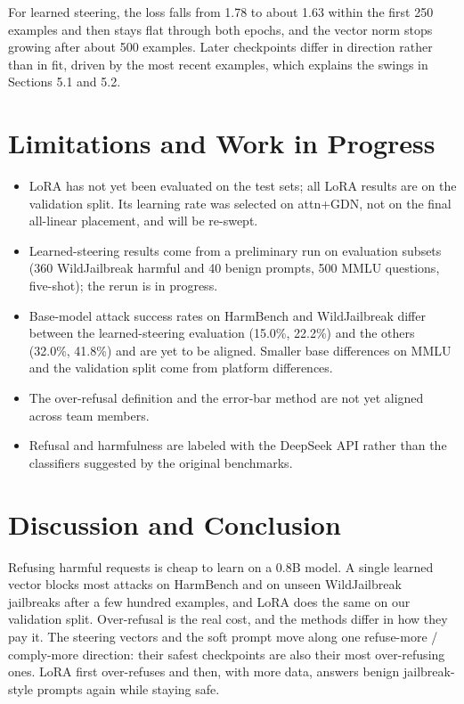 \documentclass{article}
\begin{document}
For learned steering, the loss falls from 1.78 to about 1.63 within the first 250 examples and then stays flat through both epochs, and the vector norm stops growing after about 500 examples. Later checkpoints differ in direction rather than in fit, driven by the most recent examples, which explains the swings in Sections 5.1 and 5.2.

\section{Limitations and Work in Progress}\label{sec:6}

\begin{itemize}
\item LoRA has not yet been evaluated on the test sets; all LoRA results are on the validation split. Its learning rate was selected on attn+GDN, not on the final all-linear placement, and will be re-swept.
\item Learned-steering results come from a preliminary run on evaluation subsets (360 WildJailbreak harmful and 40 benign prompts, 500 MMLU questions, five-shot); the rerun is in progress.
\item Base-model attack success rates on HarmBench and WildJailbreak differ between the learned-steering evaluation (15.0\%, 22.2\%) and the others (32.0\%, 41.8\%) and are yet to be aligned. Smaller base differences on MMLU and the validation split come from platform differences.
\item The over-refusal definition and the error-bar method are not yet aligned across team members.
\item Refusal and harmfulness are labeled with the DeepSeek API rather than the classifiers suggested by the original benchmarks.
\end{itemize}

\section{Discussion and Conclusion}\label{sec:7}

Refusing harmful requests is cheap to learn on a 0.8B model. A single learned vector blocks most attacks on HarmBench and on unseen WildJailbreak jailbreaks after a few hundred examples, and LoRA does the same on our validation split. Over-refusal is the real cost, and the methods differ in how they pay it. The steering vectors and the soft prompt move along one refuse-more / comply-more direction: their safest checkpoints are also their most over-refusing ones. LoRA first over-refuses and then, with more data, answers benign jailbreak-style prompts again while staying safe.
\end{document}
